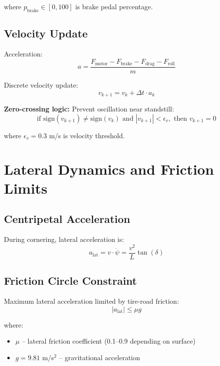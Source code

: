 \documentclass[11pt,a4paper]{article}
\begin{document}
where $p_{\text{brake}} \in [0, 100]$ is brake pedal percentage.

\subsection{Velocity Update}

Acceleration:
\begin{equation}
a = \frac{F_{\text{motor}} - F_{\text{brake}} - F_{\text{drag}} - F_{\text{roll}}}{m}
\end{equation}

Discrete velocity update:
\begin{equation}
v_{k+1} = v_k + \Delta t \cdot a_k
\end{equation}

\textbf{Zero-crossing logic:} Prevent oscillation near standstill:
\begin{equation}
\text{if } \text{sign}(v_{k+1}) \neq \text{sign}(v_k) \text{ and } |v_{k+1}| < \epsilon_v, \text{ then } v_{k+1} = 0
\end{equation}

where $\epsilon_v = 0.3$ m/s is velocity threshold.

\section{Lateral Dynamics and Friction Limits}

\subsection{Centripetal Acceleration}

During cornering, lateral acceleration is:
\begin{equation}
a_{\text{lat}} = v \cdot \dot{\psi} = \frac{v^2}{L} \tan(\delta)
\end{equation}

\subsection{Friction Circle Constraint}

Maximum lateral acceleration limited by tire-road friction:
\begin{equation}
|a_{\text{lat}}| \leq \mu g
\end{equation}

where:
\begin{itemize}
    \item $\mu$ -- lateral friction coefficient (0.1--0.9 depending on surface)
    \item $g = 9.81$ m/s$^2$ -- gravitational acceleration
\end{itemize}
\end{document}
